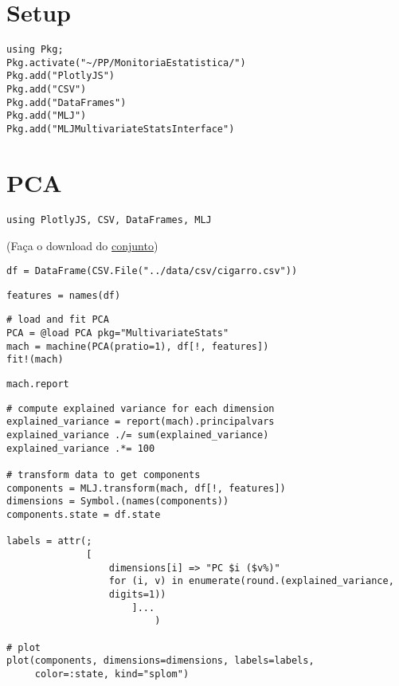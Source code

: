 \documentclass[11pt]{article}
\date{\today}
\title{}
\begin{document}
\tableofcontents



\section{Setup}
\label{sec:org3b11230}
\begin{verbatim}
using Pkg;
Pkg.activate("~/PP/MonitoriaEstatistica/")
Pkg.add("PlotlyJS")
Pkg.add("CSV")
Pkg.add("DataFrames")
Pkg.add("MLJ")
Pkg.add("MLJMultivariateStatsInterface")
\end{verbatim}


\section{PCA}
\label{sec:orgbecc5d0}

\begin{verbatim}
using PlotlyJS, CSV, DataFrames, MLJ
\end{verbatim}

(Faça o download do \href{https://r-data.pmagunia.com/dataset/r-dataset-package-plm-cigar}{conjunto})
\begin{verbatim}
df = DataFrame(CSV.File("../data/csv/cigarro.csv"))
\end{verbatim}

\begin{verbatim}
features = names(df)
\end{verbatim}

\begin{verbatim}
# load and fit PCA
PCA = @load PCA pkg="MultivariateStats"
mach = machine(PCA(pratio=1), df[!, features])
fit!(mach)
\end{verbatim}

\begin{verbatim}
mach.report
\end{verbatim}

\begin{verbatim}
# compute explained variance for each dimension
explained_variance = report(mach).principalvars
explained_variance ./= sum(explained_variance)
explained_variance .*= 100

# transform data to get components
components = MLJ.transform(mach, df[!, features])
dimensions = Symbol.(names(components))
components.state = df.state

labels = attr(;
              [
                  dimensions[i] => "PC $i ($v%)"
                  for (i, v) in enumerate(round.(explained_variance,
                  digits=1))
                      ]...
                          )

# plot
plot(components, dimensions=dimensions, labels=labels,
     color=:state, kind="splom")
\end{verbatim}
\end{document}
